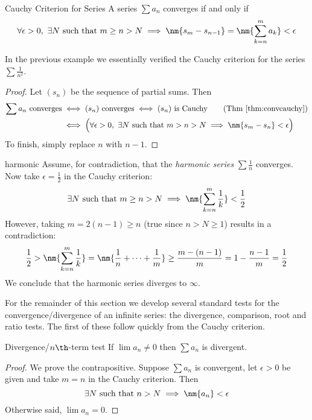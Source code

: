 \begin{thm}{Cauchy Criterion for Series}{}
	A series $\sum a_n$ converges if and only if
	\[
		\forall\epsilon>0,\ \exists N\text{ such that }m\ge n>N\implies\nm{s_m-s_{n-1}}=\nm{\sum_{k=n}^ma_k}<\epsilon
	\]
\end{thm}

In the previous example we essentially verified the Cauchy criterion for the series $\sum\frac 1{n^2}$.

\begin{proof}
	Let $(s_n)$ be the sequence of partial sums. Then
	\begin{align*}
		\sum a_n\text{ converges}&\iff (s_n)\text{ converges} \iff (s_n)\text{ is Cauchy} \tag{Thm \ref{thm:convcauchy}}\\
		&\iff \Bigl(\forall\epsilon>0,\ \exists N\text{ such that }m>n>N\implies\nm{s_m-s_n}<\epsilon\Bigr)
	\end{align*}
	To finish, simply replace $n$ with $n-1$. 
\end{proof}

\begin{example}{}{harmonic}
	Assume, for contradiction, that the \emph{harmonic series} $\sum\frac 1n$ converges. Now take $\epsilon=\frac 12$ in the Cauchy criterion:
	\[\exists N\text{ such that }m\ge n>N\implies \nm{\sum_{k=n}^{m}\frac 1k}<\frac 12\]
	However, taking $m=2(n-1)\ge n$ (true since $n>N\ge 1$) results in a contradiction: 
	\[\frac 12>\nm{\sum_{k=n}^{m}\frac 1k}=\nm{\frac 1n+\cdots+\frac 1m}\ge \frac{m-(n-1)}{m}=1-\frac{n-1}m=\frac 12\]
	We conclude that the harmonic series diverges to $\infty$.
\end{example}

\goodbreak



For the remainder of this section we develop several standard tests for the convergence/divergence of an infinite series: the divergence, comparison, root and ratio tests. The first of these follow quickly from the Cauchy criterion.

\begin{thm}{Divergence/$n\th$-term test}{}
	If $\lim a_n\neq 0$ then $\sum a_n$ is divergent.
\end{thm}

\begin{proof}
	We prove the contrapositive. Suppose $\sum a_n$ is convergent, let $\epsilon>0$ be given and take $m=n$ in the Cauchy criterion. Then
	\[\exists N\text{ such that }n>N\implies\nm{a_n}<\epsilon\]
	Otherwise said, $\lim a_n=0$.
\end{proof}


